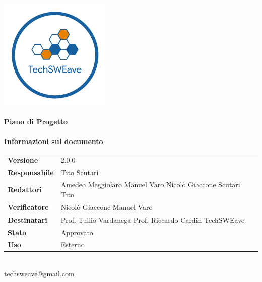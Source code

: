 \documentclass[a4paper]{article}
\begin{document}
\begin{titlepage}
    \begin{center}
        \includegraphics{../../../Images/logo}\\
        \vspace{20px}
        \textcolor{logo}{\hrulefill}\\
        \vspace{20px}
        \textbf{\huge\textcolor{logo}{Piano di Progetto}}\\
        \vspace{10px}
        \textcolor{logo}{\hrulefill}\\
        \vspace{40px}
        \textbf{\Large Informazioni sul documento}\\
        \vspace{20px}
        \begin{tabular}{p{100px} | p{100px}}
            \textbf{Versione}     & 2.0.0                                                                     \\
            \textbf{Responsabile} & Tito Scutari                                                         \\
            \textbf{Redattori}    & Amedeo Meggiolaro \newline Manuel Varo \newline Nicolò Giaccone \newline Scutari Tito                         \\
            \textbf{Verificatore} & Nicolò Giaccone \newline Manuel Varo                                                          \\
            \textbf{Destinatari}  & Prof. Tullio Vardanega \newline Prof. Riccardo Cardin \newline TechSWEave \\
            \textbf{Stato}        & Approvato                                                                 \\
            \textbf{Uso}          & Esterno                                                                   \\
        \end{tabular}\\
        \vspace{60px}
        \href{mailto:techsweave@gmail.com}{techsweave@gmail.com}\\

    \end{center}
\end{titlepage}
\end{document}
